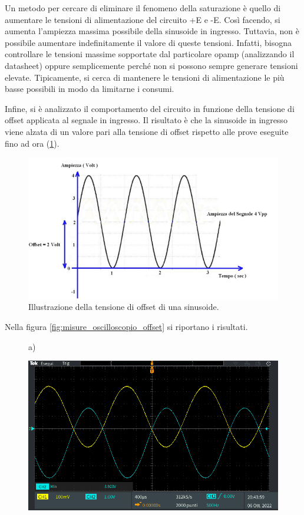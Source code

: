\noindent
Un metodo per cercare di eliminare il fenomeno della saturazione è quello di aumentare le tensioni di alimentazione del circuito +E e -E. Così facendo, si aumenta l'ampiezza massima possibile della sinusoide in ingresso. Tuttavia, non è possibile aumentare indefinitamente il valore di queste tensioni. Infatti, bisogna controllare le tensioni massime sopportate dal particolare opamp (analizzando il datasheet) oppure semplicemente perché non si possono sempre generare tensioni elevate. Tipicamente, si cerca di mantenere le tensioni di alimentazione le più basse possibili in modo da limitarne i consumi.

\newpage
Infine, si è analizzato il comportamento del circuito in funzione della tensione di offset applicata al segnale in ingresso. Il risultato è che la sinusoide in ingresso viene alzata di un valore pari alla tensione di offset rispetto alle prove eseguite fino ad ora (\Fig\ref{fig:misure_oscilloscopio_offset_sinusoide}).
\begin{figure}[h!]
	\centering
	\includegraphics[width=0.6\linewidth]{./ImageFiles/Laboratorio 1/tensione offset}
	\caption{Illustrazione della tensione di offset di una sinusoide.}
	\label{fig:misure_oscilloscopio_offset_sinusoide}
\end{figure} 
\clearpage
Nella figura \ref{fig:misure_oscilloscopio_offset} si riportano i risultati.
\begin{figure}[h!]
	\centering
	a)
	
	\includegraphics[width=0.8\linewidth]{./ImageFiles/Laboratorio 1/TEK00012}	
\end{figure}
